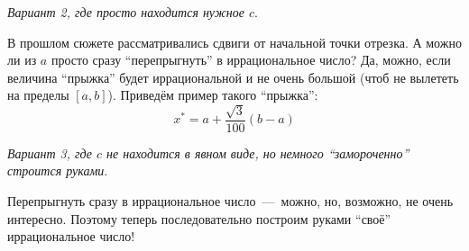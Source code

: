 \documentclass[a4paper,12pt]{article}
\begin{document}
\begin{solution}
    \medskip
    
    \emph{Вариант 2, где просто находится нужное $c$}.
    
    В прошлом сюжете рассматривались сдвиги от начальной точки отрезка.
    А можно ли из $a$ просто сразу ``перепрыгнуть'' в иррациональное число?
    Да, можно, если величина ``прыжка'' будет иррациональной и не очень большой (чтоб не вылететь на пределы $[a, b]$).
    Приведём пример такого ``прыжка'':
    \[
      x^* = a + \frac{\sqrt{3}}{100} (b - a)
    \]
    
    \emph{Вариант 3, где $c$ не находится в явном виде, но немного ``замороченно'' строится руками}.
    
    Перепрыгнуть сразу в иррациональное число~---~можно, но, возможно, не очень интересно.
    Поэтому теперь последовательно построим руками ``своё'' иррациональное число!
    

\end{solution}
\end{document}
